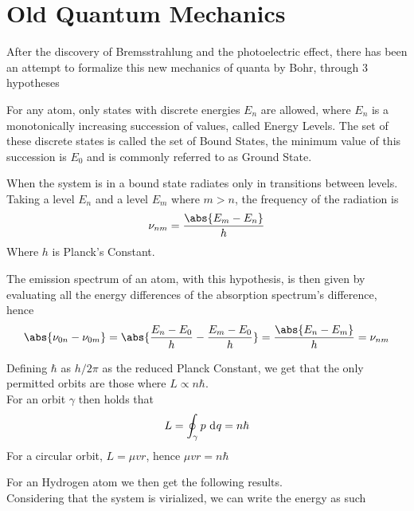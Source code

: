 \documentclass[../qm.tex]{subfiles}
\begin{document}
	\section{Old Quantum Mechanics}
	After the discovery of Bremsstrahlung and the photoelectric effect, there has been an attempt to formalize this new mechanics of quanta by Bohr, through 3 hypotheses
	\begin{hyp}
		For any atom, only states with discrete energies $E_n$ are allowed, where $E_n$ is a monotonically increasing succession of values, called Energy Levels. The set of these discrete states is called the set of Bound States, the minimum value of this succession is $E_0$ and is commonly referred to as Ground State.
	\end{hyp}
	\begin{hyp}
		When the system is in a bound state radiates only in transitions between levels.\\
		Taking a level $E_n$ and a level $E_m$ where $m>n$, the frequency of the radiation is
		\begin{equation*}
			\nu_{nm}=\frac{\abs{E_m-E_n}}{h}
		\end{equation*}
		Where $h$ is Planck's Constant.
	\end{hyp}
	\begin{cor}
		The emission spectrum of an atom, with this hypothesis, is then given by evaluating all the energy differences of the absorption spectrum's difference, hence
		\begin{equation*}
			\abs{\nu_{0n}-\nu_{0m}}=\abs{\frac{E_n-E_0}{h}-\frac{E_m-E_0}{h}}=\frac{\abs{E_n-E_m}}{h}=\nu_{nm}
		\end{equation*}
	\end{cor}
	\begin{hyp}
		Defining $\hbar$ as $h/2\pi$ as the reduced Planck Constant, we get that the only permitted orbits are those where $L\propto n\hbar$.\\
		For an orbit $\gamma$ then holds that
		\begin{equation*}
			L=\oint_{\gamma}p\ \mathrm{d}^{}q=n\hbar
		\end{equation*}
		For a circular orbit, $L=\mu vr$, hence
		$\mu vr=n\hbar$
	\end{hyp}
	For an Hydrogen atom we then get the following results.\\
	Considering that the system is virialized, we can write the energy as such
\end{document}
